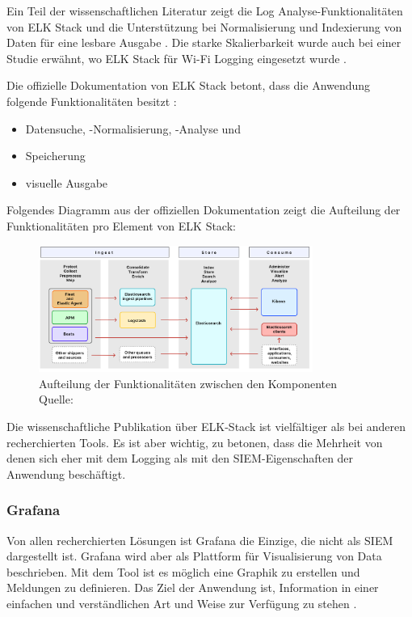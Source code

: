 Ein Teil der wissenschaftlichen Literatur zeigt die Log Analyse-Funktionalitäten von ELK Stack und die Unterstützung bei Normalisierung und Indexierung von Daten für eine lesbare Ausgabe \citep{Advani_elkstakc}. Die starke Skalierbarkeit wurde auch bei einer Studie erwähnt, wo ELK Stack für Wi-Fi Logging eingesetzt wurde \citep{Wang_elkwifi}. 

Die offizielle Dokumentation von ELK Stack betont, dass die Anwendung folgende Funktionalitäten besitzt \citep{elastic_docs}: 

\begin{itemize}[noitemsep]
   \item Datensuche, -Normalisierung, -Analyse und 
   \item Speicherung
   \item visuelle Ausgabe
\end{itemize}

Folgendes Diagramm aus der offiziellen Dokumentation zeigt die Aufteilung der Funktionalitäten pro Element von ELK Stack:

\begin{figure}[H]
   \centering
   \includegraphics[width=0.8\textwidth]{assets/2_p9.png}
   \caption[Aufteilung der Funktionalitäten zwischen den Komponenten]
   {Aufteilung der Funktionalitäten zwischen den Komponenten\\Quelle: \citep{elastic_docs}}
   \centering
\end{figure}

Die wissenschaftliche Publikation über ELK-Stack ist vielfältiger als bei anderen recherchierten Tools. Es ist aber wichtig, zu betonen, dass die Mehrheit von denen sich eher mit dem Logging als mit den \gls{SIEM}-Eigenschaften der Anwendung beschäftigt.

\subsubsection{Grafana}
Von allen recherchierten Lösungen ist Grafana die Einzige, die nicht als \gls{SIEM} dargestellt ist. Grafana wird aber als Plattform für Visualisierung von Data beschrieben. Mit dem Tool ist es möglich eine Graphik zu erstellen und Meldungen zu definieren. Das Ziel der Anwendung ist, Information in einer einfachen und verständlichen Art und Weise zur Verfügung zu stehen \citep{redhat_grafana}.  

